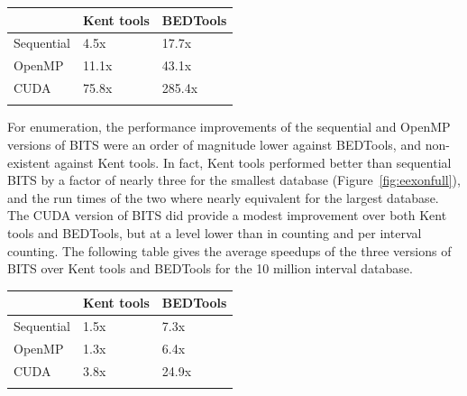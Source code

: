 \documentclass{bioinfo}
\begin{document}
		\begin{center}
			\begin{tabular}{lll}
				\\
				& Kent tools & BEDTools \\
				\hline
				Sequential	& 4.5x	& 17.7x \\
				OpenMP		& 11.1x	& 43.1x \\
				CUDA		& 75.8x	& 285.4x \\
				\\
			\end{tabular}
		\end{center}

		For enumeration, the performance improvements of the  sequential and OpenMP
		versions of BITS were an order of magnitude lower against BEDTools, and
		non-existent against Kent tools.  In fact, Kent tools performed better than
		sequential BITS by a factor of nearly three for the smallest database
		(Figure~\ref{fig:eexonfull}), and the run times of the two where nearly
		equivalent for the largest database.  The CUDA version of BITS did provide a
		modest improvement over both Kent tools and BEDTools, but at a level lower than
		in counting and per interval counting.
		The following table  gives the average speedups of the three versions of BITS
		over Kent tools and BEDTools for the 10 million interval database.

		\begin{center}
			\begin{tabular}{lll}
				\\
				& Kent tools & BEDTools \\
				\hline
				Sequential	& 1.5x & 7.3x \\
				OpenMP		& 1.3x & 6.4x \\
				CUDA		& 3.8x & 24.9x \\
				\\
			\end{tabular}
		\end{center}
\end{document}
